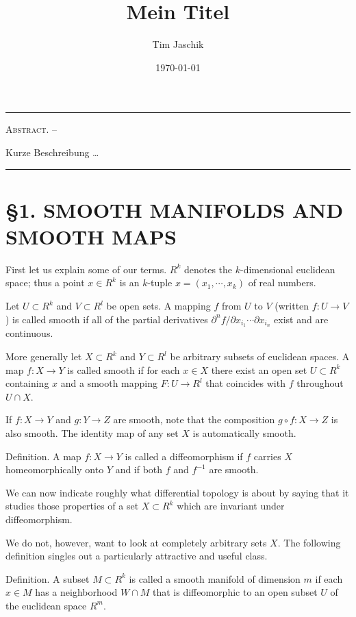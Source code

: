 \documentclass[10pt, letterpaper]{article}
\title{Mein Titel}
\author{Tim Jaschik}
\date{\today}
\renewenvironment{abstract}
  {
    \begin{adjustwidth}{1.5cm}{1.5cm}
    \small
    \textsc{Abstract. –}%
  }
  {
    \end{adjustwidth}
  }
\begin{document}
\maketitle
\rule{\textwidth}{0.5pt}
\begin{abstract}
Kurze Beschreibung …
\end{abstract}
\rule{\textwidth}{0.5pt}
\vspace{0.5cm}

\tableofcontents

\pagebreak


\section*{§1. SMOOTH MANIFOLDS AND SMOOTH MAPS}


First let us explain some of our terms. $R^{k}$ denotes the $k$-dimensional euclidean space; thus a point $x \in R^{k}$ is an $k$-tuple $x=\left(x_{1}, \cdots, x_{k}\right)$ of real numbers.

Let $U \subset R^{k}$ and $V \subset R^{l}$ be open sets. A mapping $f$ from $U$ to $V$ (written $f: U \rightarrow V$ ) is called smooth if all of the partial derivatives $\partial^{n} f / \partial x_{i_{1}} \cdots \partial x_{i_{n}}$ exist and are continuous.

More generally let $X \subset R^{k}$ and $Y \subset R^{l}$ be arbitrary subsets of euclidean spaces. A map $f: X \rightarrow Y$ is called smooth if for each $x \in X$ there exist an open set $U \subset R^{k}$ containing $x$ and a smooth mapping $F: U \rightarrow R^{l}$ that coincides with $f$ throughout $U \cap X$.

If $f: X \rightarrow Y$ and $g: Y \rightarrow Z$ are smooth, note that the composition $g \circ f: X \rightarrow Z$ is also smooth. The identity map of any set $X$ is automatically smooth.

Definition. A map $f: X \rightarrow Y$ is called a diffeomorphism if $f$ carries $X$ homeomorphically onto $Y$ and if both $f$ and $f^{-1}$ are smooth.

We can now indicate roughly what differential topology is about by saying that it studies those properties of a set $X \subset R^{k}$ which are invariant under diffeomorphism.

We do not, however, want to look at completely arbitrary sets $X$. The following definition singles out a particularly attractive and useful class.

Definition. A subset $M \subset R^{k}$ is called a smooth manifold of dimension $m$ if each $x \in M$ has a neighborhood $W \cap M$ that is diffeomorphic to an open subset $U$ of the euclidean space $R^{m}$.
\end{document}
